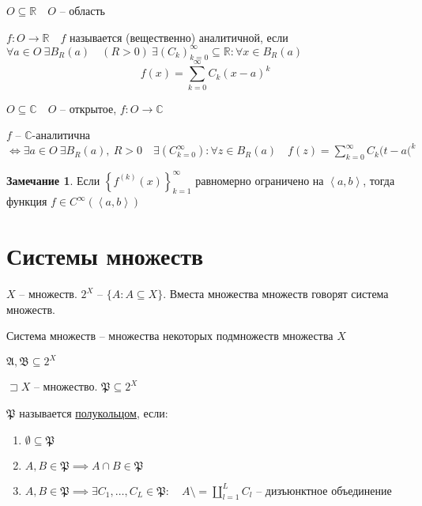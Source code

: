 \documentclass{book}
\newcommand\R{\ensuremath{\mathbb{R}}}
\renewcommand\O{\ensuremath{\emptyset}}
\renewcommand\C{\ensuremath{\mathbb{C}}}
\theoremstyle{definition}
\newtheorem*{note}{Замечание}
\begin{document}
    $O\subseteq \R\quad O$ -- область

    $f: O\to \R\quad f$ называется (вещественно) аналитичной, если $\forall a\in O \ \exists B_R(a)\quad (R>0)\ \exists \left( C_k \right) _{k=0}^{\infty }\subseteq \R: \forall x\in B_R(a)$ \[f(x) = \sum_{k=0}^{\infty } C_k(x-a)^k\]

    \begin{definition}

        $O\subseteq \C\quad O$ -- открытое, $f: O \to \C$

        $f$ --  $\C$-аналитична $\iff  \exists a\in O \ \exists B_R(a),\ R>0\quad \exists \left( C_{k=0}^{\infty } \right) :\forall z\in B_R(a)\quad f(z) = \sum_{k=0}^{\infty } C_k(t-a(^k$
    \end{definition}

    \begin{note}
        Если $\left\{ f^{(k)}(x) \right\} _{k=1}^{\infty }$ равномерно ограничено на $\left<a,b \right>$, тогда функция $f\in C^{\infty }\left( \left<a,b \right> \right) $
    \end{note}



\section{Системы множеств}

$X$ -- множеств.  $2^X$ --  $\{A:A\subseteq X\}$. Вместа множества множеств говорят система множеств.

\begin{definition}
    Система множеств -- множества некоторых подмножеств множества $X$

    $\mathfrak{A, B}\subseteq 2^X$
\end{definition}

\begin{definition}
    $\sqsupset X$ -- множество. $\mathfrak P \subseteq 2^X$ 

    $\mathfrak P$ называется \underline{полукольцом}, если:
     \begin{enumerate}
        \item $\O \subseteq \mathfrak P$
        \item $A, B\in \mathfrak P \implies A\cap B \in \mathfrak P$
        \item $A, B \in \mathfrak P \implies \exists C_1, \ldots, C_L \in \mathfrak P:\quad A\setminus = \coprod_{l=1}^L C_l$ -- дизъюнктное объединение 
    \end{enumerate}
\end{definition}
\end{document}
